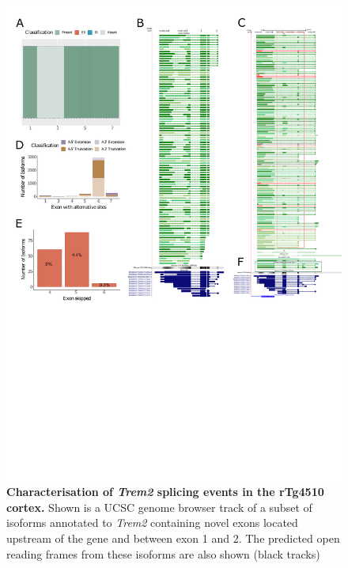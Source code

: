 \begin{figure}[htp]
	\centering
	\captionsetup{width=0.95\textwidth}
	\includegraphics[page=8,trim={0 23cm 0 0},scale = 0.85]{Figures/TargetGenes_Annotation_Portrait.pdf}
	\caption[Characterisation of \textit{Trem2} novel exons]%
	{\textbf{Characterisation of \textit{Trem2} splicing events in the rTg4510 cortex.} Shown is a UCSC genome browser track of a subset of isoforms annotated to \textit{Trem2} containing novel exons located upstream of the gene and between exon 1 and 2. The predicted open reading frames from these isoforms are also shown (black tracks)}    
	\label{fig:trem2_orf}
\end{figure}




